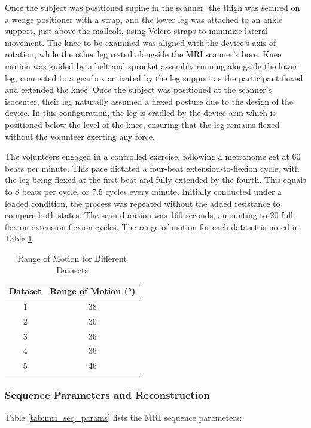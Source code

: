 \documentclass{micro-econ-thesis}
\begin{document}
Once the subject was positioned supine in the scanner, the thigh was secured on a wedge positioner with a strap, and the lower leg was attached to an ankle support, just above the malleoli, using Velcro straps to minimize lateral movement. The knee to be examined was aligned with the device’s axis of rotation, while the other leg rested alongside the MRI scanner's bore.  Knee motion was guided by a belt and sprocket assembly running alongside the lower leg, connected to a gearbox activated by the leg support as the participant flexed and extended the knee. Once the subject was positioned at the scanner's isocenter, their leg naturally assumed a flexed posture due to the design of the device. In this configuration, the leg is cradled by the device arm which is positioned below the level of the knee, ensuring that the leg remains flexed without the volunteer exerting any force.


The volunteers engaged in a controlled exercise, following a metronome set at 60 beats per minute. This pace dictated a four-beat extension-to-flexion cycle, with the leg being flexed at the first beat and fully extended by the fourth. This equals to 8 beats per cycle, or 7.5 cycles every minute. Initially conducted under a loaded condition, the process was repeated without the added resistance to compare both states. The scan duration was 160 seconds, amounting to 20 full flexion-extension-flexion cycles. The range of motion for each dataset is noted in Table \ref{tab:range_of_motion}. 

\begin{table}[H]
	\centering
	
	\caption{Range of Motion for Different Datasets}
	\label{tab:range_of_motion}
	\begin{tabular}{cc}
		\toprule
		Dataset & Range of Motion (°) \\
		\midrule
		1 & 38 \\
		2 & 30 \\
		3 & 36 \\
		4 & 36 \\
		5 & 46 \\
		\bottomrule
	\end{tabular}
	
	
\end{table}

\subsubsection{Sequence Parameters and Reconstruction}
Table \ref{tab:mri_seq_params} lists the MRI sequence parameters:
\end{document}
